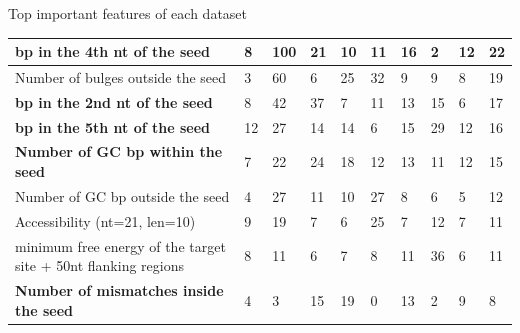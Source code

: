 \documentclass{beamer}
\begin{document}
\begin{frame}{Top important features of each dataset}
\begin{table}[h!]
\begin{threeparttable}
{\begin{tabular}{|l|l|l|l|l|l|l|l|l|l|}
\textbf{bp in the 4th nt of the seed\tnote{b}}                    & 8            & 100\tnote{*}          & 21           & 10          & 11          & 16          & 2           & 12          & 22            \\ \hline
Number of bulges outside the seed\tnote{n}                 & 3            & 60\tnote{*}           & 6            & 25\tnote{*}          & 32\tnote{*}          & 9           & 9           & 8           & 19            \\ \hline
\textbf{bp in the 2nd nt of the seed\tnote{b}}                    & 8            & 42           & 37\tnote{*}           & 7           & 11          & 13          & 15          & 6           & 17            \\ \hline
\textbf{bp in the 5th nt of the seed\tnote{b}}                    & 12           & 27           & 14           & 14          & 6           & 15          & 29\tnote{*}          & 12          & 16            \\ \hline
\textbf{Number of GC bp within the seed\tnote{n}}              & 7            & 22           & 24\tnote{*}           & 18\tnote{*}          & 12          & 13          & 11          & 12          & 15            \\ \hline
Number of GC bp outside the seed\tnote{n}                         & 4            & 27           & 11           & 10          & 27\tnote{*}          & 8           & 6           & 5           & 12            \\ \hline
Accessibility (nt=21, len=10)\tnote{n}                                    & 9            & 19           & 7            & 6           & 25          & 7           & 12          & 7           & 11            \\ \hline
minimum free energy of the target site + 50nt flanking regions\tnote{n}            & 8            & 11           & 6            & 7           & 8           & 11          & 36\tnote{*}          & 6           & 11            \\ \hline
\textbf{Number of mismatches inside the seed\tnote{n}}    & 4            & 3            & 15           & 19\tnote{*}          & 0           & 13          & 2           & 9           & 8             \\ \hline
\end{tabular}}

 \end{threeparttable}

\end{table}
\end{frame}
\end{document}
